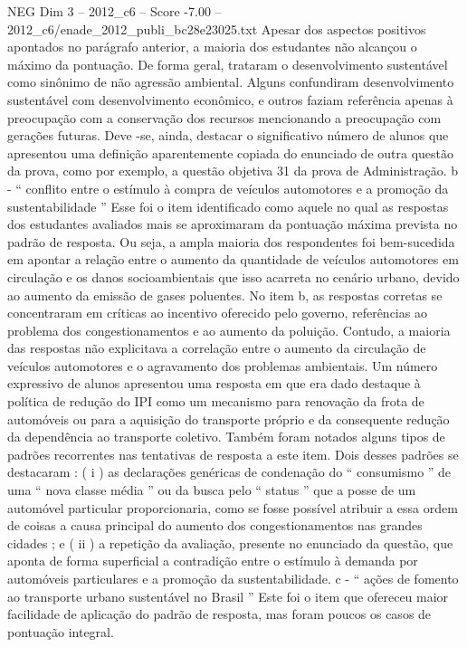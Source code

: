 \begin{textsample}{NEG Dim 3 – 2012\_c6 – Score -7.00 – 2012\_c6/enade\_2012\_publi\_bc28e23025.txt}
Apesar dos aspectos positivos apontados no parágrafo anterior, a maioria dos estudantes não alcançou o máximo da pontuação.
De forma geral, trataram o desenvolvimento sustentável como sinônimo de não agressão ambiental.
Alguns confundiram desenvolvimento sustentável com desenvolvimento econômico, e outros faziam referência apenas à preocupação com a conservação dos recursos mencionando a preocupação com gerações futuras.
Deve -se, ainda, destacar o significativo número de alunos que apresentou uma definição aparentemente copiada do enunciado de outra questão da prova, como por exemplo, a questão objetiva 31 da prova de Administração. b - “ conflito entre o estímulo à compra de veículos automotores e a promoção da sustentabilidade ” Esse foi o item identificado como aquele no qual as respostas dos estudantes avaliados mais se aproximaram da pontuação máxima prevista no padrão de resposta.
Ou seja, a ampla maioria dos respondentes foi bem-sucedida em apontar a relação entre o aumento da quantidade de veículos automotores em circulação e os danos socioambientais que isso acarreta no cenário urbano, devido ao aumento da emissão de gases poluentes.
No item b, as respostas corretas se concentraram em críticas ao incentivo oferecido pelo governo, referências ao problema dos congestionamentos e ao aumento da poluição.
Contudo, a maioria das respostas não explicitava a correlação entre o aumento da circulação de veículos automotores e o agravamento dos problemas ambientais.
Um número expressivo de alunos apresentou uma resposta em que era dado destaque à política de redução do IPI como um mecanismo para renovação da frota de automóveis ou para a aquisição do transporte próprio e da consequente redução da dependência ao transporte coletivo.
Também foram notados alguns tipos de padrões recorrentes nas tentativas de resposta a este item.
Dois desses padrões se destacaram : ( i ) as declarações genéricas de condenação do “ consumismo ” de uma “ nova classe média ” ou da busca pelo “ status ” que a posse de um automóvel particular proporcionaria, como se fosse possível atribuir a essa ordem de coisas a causa principal do aumento dos congestionamentos nas grandes cidades ; e ( ii ) a repetição da avaliação, presente no enunciado da questão, que aponta de forma superficial a contradição entre o estímulo à demanda por automóveis particulares e a promoção da sustentabilidade. c - “ ações de fomento ao transporte urbano sustentável no Brasil ” Este foi o item que ofereceu maior facilidade de aplicação do padrão de resposta, mas foram poucos os casos de pontuação integral.

\end{textsample}
